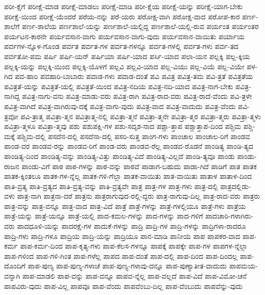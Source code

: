 {ಪರೀ-ಕ್ಷೆಗೆ
ಪರೀಕ್ಷೆ-ಮಾಡ
ಪರೀಕ್ಷೆ-ಮಾಡಲು
ಪರೀಕ್ಷೆ-ಮಾಡಿ
ಪರೀ-ಕ್ಷೆಯ
ಪರೀಕ್ಷೆ-ಯನ್ನು
ಪರೀಕ್ಷೆ-ಯಾಗ-ಬೇಕು
ಪರೀಕ್ಷೆ-ಯಿಂದ
ಪರೀಕ್ಷೆ-ಯೆಂದರೆ
ಪರೆಯ-ನನ್ನು
ಪರೆ-ಯರು
ಪರೋಕ್ಷ-ವಾಗಿ
ಪರೋಕ್ಷ-ವಾದ
ಪರೋಪ-ಕಾರ
ಪರ್ಣ-ಶಾಲೆಗೆ
ಪರ್ಣ-ಶಾಲೆಯ
ಪರ್ಣಶಾಲೆ-ಯನ್ನು
ಪರ್ಣಶಾಲೆ-ಯಲ್ಲಿದ್ದ
ಪರ್ಣಶಾಲೆ-ಯಲ್ಲಿ-ರುವ
ಪರ್ಯಂತ
ಪರ್ಯಂತರ
ಪರ್ಯಟನ-ಕಾರನೇ
ಪರ್ಯವಸಾನ-ವಾಗು
ಪರ್ಯವಸಾನ-ವಾಗು-ವುದು
ಪರ್ಯವಸಾನ-ವಾಯಿತು
ಪರ್ಯಾಯ
ಪರ್ವಗಳ-ನ್ನೊಳ-ಗೊಂಡ
ಪರ್ವತ
ಪರ್ವತ-ಗಳ
ಪರ್ವತ-ಗಳನ್ನೂ
ಪರ್ವತ-ಗಳಲ್ಲಿ
ಪರ್ವತ-ಗಳು
ಪರ್ವ-ತದ
ಪರ್ವತೋ-ಪಮ
ಪರ್ಷಿ
ಪರ್ಷಿ-ಯನ್
ಪರ್ಷಿಯಾ
ಪರ್ಷಿ-ಯಾದ
ಪರ್ಸಿ-ಯಾದ
ಪಲಾ-ಯನ
ಪಲ್ಲಕ್ಕಿ
ಪಲ್ಲ-ಕ್ಕಿಯ
ಪಲ್ಲಕ್ಕಿ-ಯನ್ನು
ಪಲ್ಲಕ್ಕಿ-ಯಿಂದ
ಪಲ್ಲಕ್ಕಿ-ಯೊಳಗೆ
ಪಲ್ಲವಿ
ಪಲ್ಲವಿ-ಯಾದ
ಪಲ್ಲ-ವಿಯು
ಪಲ್ಲ-ವಿಯೆ
ಪಲ್ಲ-ವಿಯೇ
ಪಳ-ಗಿದ
ಪವ-ಹಾರಿ
ಪವಹಾರಿ-ಬಾಬಾರು
ಪವಾಡ-ಗಳು
ಪವಾಡ-ದಂತೆ
ಪವಿ
ಪವಿತ್ರ
ಪವಿತ್ರ-ತಮ
ಪವಿ-ತ್ರತೆ
ಪವಿತ್ರತೆಯ
ಪವಿತ್ರತೆ-ಯನ್ನು
ಪವಿತ್ರತೆ-ಯಲ್ಲಿ
ಪವಿತ್ರತೆ-ಯಿಂದ
ಪವಿತ್ರ-ನದಿಯ
ಪವಿತ್ರ-ನದಿ-ಯಾದ
ಪವಿತ್ರ-ನಾಗ-ಬೇಕು
ಪವಿತ್ರ-ನಾಗಿದ್ದ
ಪವಿತ್ರ-ನಾಗು-ವನು
ಪವಿತ್ರ-ಮಾಡು-ವರು
ಪವಿತ್ರ-ರಾಗಿ
ಪವಿತ್ರ-ರಾದ-ವರು
ಪವಿತ್ರ-ರಾದೆ-ವೆಂದು
ಪವಿ-ತ್ರಳೇ
ಪವಿತ್ರ-ವಾಗಿದೆ
ಪವಿತ್ರ-ವಾಗಿರುವು-ದಕ್ಕೆ
ಪವಿತ್ರ-ವಾಗು-ವುದು
ಪವಿತ್ರ-ವಾದ
ಪವಿತ್ರ-ವಾದುದು
ಪವಿತ್ರ-ವೆಂದು
ಪವಿ-ತ್ರವೋ
ಪವಿ-ತ್ರಾತ್ಮ
ಪವಿತ್ರಾ-ತ್ಮನ
ಪವಿತ್ರಾತ್ಮ-ನಲ್ಲಿ
ಪವಿತ್ರಾ-ತ್ಮನೆ
ಪವಿತ್ರಾ-ತ್ಮನೇ
ಪವಿತ್ರಾ-ತ್ಮರ
ಪವಿತ್ರಾ-ತ್ಮರು
ಪವಿತ್ರಾ-ತ್ಮಳು
ಪವಿತ್ರಾ-ತ್ಮಳೂ
ಪವಿತ್ರಾ-ತ್ಮವು
ಪಶು
ಪಶುಪಕ್ಷಿ-ಗಳ
ಪಶು-ಸದೃಶ-ನಾದ
ಪಶ್ಚಾ-ತ್ತಾಪ
ಪಶ್ಚಾತ್ತಾಪ-ದಿಂದ
ಪಶ್ಚಿಮ
ಪಶ್ಚಿ-ಮಕ್ಕೆ
ಪಶ್ಚಿಮ-ದಲ್ಲಿ
ಪಸದೆನ-ದಲ್ಲಿ
ಪಸದೆನಾ-ದಲ್ಲಿ
ಪಸರಿ-ಸುತ್ತ
ಪಾಂಗ-ಗಳು
ಪಾಂಚಾಲ
ಪಾಂಚಾಲ-ರಿಗೆ
ಪಾಂಡವ
ಪಾಂಡ-ವರ
ಪಾಂಡವ-ರನ್ನು
ಪಾಂಡವ-ರಿಗೆ
ಪಾಂಡ-ವರು
ಪಾಂಡವ-ರೆಲ್ಲ
ಪಾಂಡವ-ರೊಡನೆ
ಪಾಂಡಿತ್ಯ
ಪಾಂಡಿ-ತ್ಯದ
ಪಾಂಡಿತ್ಯ-ದಿಂದ
ಪಾಂಡಿತ್ಯ-ವನ್ನು
ಪಾಂಡಿತ್ಯ-ವಿತ್ತು
ಪಾಂಡಿತ್ಯ-ವಿದೆ
ಪಾಂಡಿತ್ಯ-ವಿಲ್ಲದೆ
ಪಾಂಡಿ-ತ್ಯವೂ
ಪಾಂಡು
ಪಾಂಡು-ರಾಜನ
ಪಾಂಡು-ವಿಗೆ
ಪಾಠ
ಪಾಠ-ಗಳನ್ನು
ಪಾಠ-ವನ್ನು
ಪಾಠವೆ
ಪಾಡಾಗ-ಬಹುದು
ಪಾಡಾ-ಗಿದೆ
ಪಾಡಿಗೆ
ಪಾತ
ಪಾತಕ
ಪಾತಕ-ಕ್ಕಿಂತಲೂ
ಪಾತಕ-ಗಳ-ನ್ನೆಲ್ಲ
ಪಾತಕ-ಗಳಿ-ಗೆಲ್ಲಾ
ಪಾತಕ-ವಾಯಿತು
ಪಾತ-ವಾಯಿತು
ಪಾತಾಳ
ಪಾತಾಳ-ದಿಂದ
ಪಾತಿ-ವ್ರತ್ಯ
ಪಾತಿ-ವ್ರತ್ಯದ
ಪಾತಿ-ವ್ರತ್ಯ-ವನ್ನು
ಪಾತಿ-ವ್ರತ್ಯವೇ
ಪಾತ್ರ
ಪಾತ್ರ-ಗಳ
ಪಾತ್ರ-ಗಳು
ಪಾತ್ರ-ದಲ್ಲಿ
ಪಾತ್ರದಲ್ಲಿಡು-ವಳು
ಪಾತ್ರ-ನಾಗಿ
ಪಾತ್ರನಾ-ದರೆ
ಪಾತ್ರನು
ಪಾತ್ರರಾಗುವುದ-ರಲ್ಲಿ-ದ್ದರು
ಪಾತ್ರ-ರಾಗುವು-ದಿಲ್ಲ
ಪಾತ್ರ-ರಾದ-ವರು
ಪಾತ್ರರು
ಪಾತ್ರ-ವನ್ನು
ಪಾತ್ರ-ವನ್ನೂ
ಪಾತ್ರ-ವಾದ
ಪಾತ್ರ-ವಿದೆ
ಪಾತ್ರೆ
ಪಾತ್ರೆ-ಗಳನ್ನು
ಪಾತ್ರೆ-ಗಳಲ್ಲಿಯೂ
ಪಾತ್ರೆ-ಗಳು
ಪಾತ್ರೆಯ
ಪಾತ್ರೆ-ಯನ್ನು
ಪಾತ್ರೆ-ಯನ್ನೂ
ಪಾತ್ರೆ-ಯಲ್ಲಿ
ಪಾದ-ಕಮಲ-ಗಳನ್ನು
ಪಾದ-ಗಳನ್ನು
ಪಾದ-ಗಳಿಗೆ
ಪಾದಚಾರಿ-ಗಳಾಗಿರು-ವರು
ಪಾದಧೂಳಿ-ಯನ್ನು
ಪಾದರಕ್ಷೆ-ಗಳ
ಪಾದುಕೆ-ಗಳನ್ನು
ಪಾದ್ರಿ
ಪಾದ್ರಿ-ಗಳ
ಪಾದ್ರಿ-ಗಳನ್ನು
ಪಾದ್ರಿಗಳಾ-ರಾದರೂ
ಪಾದ್ರಿ-ಗಳು
ಪಾದ್ರಿ-ಗಳೂ
ಪಾದ್ರಿಯ
ಪಾದ್ರಿ-ಯನ್ನು
ಪಾದ್ರಿಯೂ
ಪಾನ-ಮಾಡಿ
ಪಾನೀಯ
ಪಾಪ
ಪಾಪಕರ-ವಾದ
ಪಾಪ-ಕರ್ಮ
ಪಾಪ-ಕರ್ಮ-ದಿಂದ
ಪಾಪ-ಕೃತ್ಯ-ಗಳು
ಪಾಪ-ಕೆಲಸ-ಗಳನ್ನೂ
ಪಾಪಕ್ಕೆ
ಪಾಪಕ್ಕೇ
ಪಾಪ-ಗಳ
ಪಾಪಗಳ-ನ್ನೆಲ್ಲಾ
ಪಾಪ-ಗಳಿಂದ
ಪಾಪ-ಗಳಿ-ಗಿಂತ
ಪಾಪ-ಗಳೆಲ್ಲ
ಪಾಪದ
ಪಾಪ-ದಂತೆ
ಪಾಪ-ದಲ್ಲಿ
ಪಾಪ-ದಿಂದ
ಪಾಪ-ದಿಂದಲ್ಲ
ಪಾಪ-ದೊಂದಿಗೆ
ಪಾಪ-ಪುಣ್ಯ
ಪಾಪ-ಪುಣ್ಯ-ಗಳಾಚೆ
ಪಾಪ-ಪುಣ್ಯ-ಗಳಾವು-ದನ್ನೂ
ಪಾಪ-ಪುಣ್ಯಾತೀತ-ವಾದುದು
ಪಾಪಮಯ-ವನ್ನಾಗಿ
ಪಾಪ-ಮಾಡಲಿ
ಪಾಪ-ವನ್ನು
ಪಾಪ-ವನ್ನೂ
ಪಾಪವ-ನ್ನೆಲ್ಲ
ಪಾಪ-ವಲ್ಲದೆ
ಪಾಪ-ವಿದೆ
ಪಾಪ-ವಿಮೋ-ಚನೆ
ಪಾಪವಿರು-ವುದು
ಪಾಪ-ವಿಲ್ಲ
ಪಾಪವೂ
ಪಾಪ-ವೆಂದು
ಪಾಪವೆಂಬು-ದಿಲ್ಲ
ಪಾಪ-ವೆಂಬುದು
ಪಾಪವೆನ್ನು-ವುದು
}
